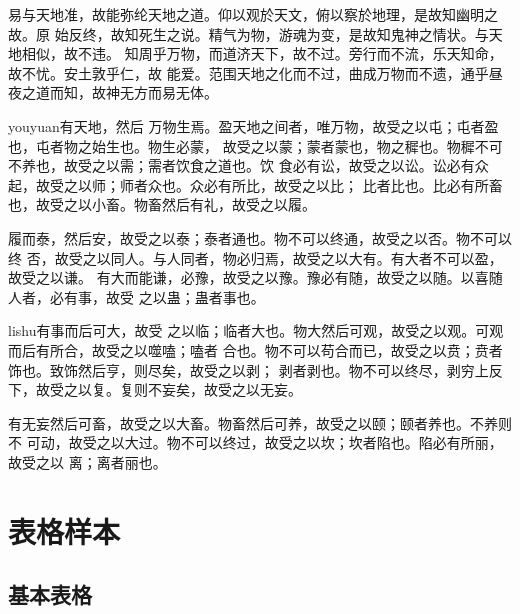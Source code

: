 {\fangsong 易与天地准，故能弥纶天地之道。仰以观於天文，俯以察於地理，是故知幽明之故。原
  始反终，故知死生之说。精气为物，游魂为变，是故知鬼神之情状。与天地相似，故不违。
  知周乎万物，而道济天下，故不过。旁行而不流，乐天知命，故不忧。安土敦乎仁，故
  能爱。范围天地之化而不过，曲成万物而不遗，通乎昼夜之道而知，故神无方而易无体。}

{\ifcsname youyuan\endcsname\youyuan\else[无 \cs{youyuan} 字体。]\fi 有天地，然后
  万物生焉。盈天地之间者，唯万物，故受之以屯；屯者盈也，屯者物之始生也。物生必蒙，
  故受之以蒙；蒙者蒙也，物之穉也。物穉不可不养也，故受之以需；需者饮食之道也。饮
  食必有讼，故受之以讼。讼必有众起，故受之以师；师者众也。众必有所比，故受之以比；
  比者比也。比必有所畜也，故受之以小畜。物畜然后有礼，故受之以履。}

{\heiti 履而泰，然后安，故受之以泰；泰者通也。物不可以终通，故受之以否。物不可以终
  否，故受之以同人。与人同者，物必归焉，故受之以大有。有大者不可以盈，故受之以谦。
  有大而能谦，必豫，故受之以豫。豫必有随，故受之以随。以喜随人者，必有事，故受
  之以蛊；蛊者事也。}

{\ifcsname lishu\endcsname\lishu\else[无 \cs{lishu} 字体。]\fi 有事而后可大，故受
  之以临；临者大也。物大然后可观，故受之以观。可观而后有所合，故受之以噬嗑；嗑者
  合也。物不可以苟合而已，故受之以贲；贲者饰也。致饰然后亨，则尽矣，故受之以剥；
  剥者剥也。物不可以终尽，剥穷上反下，故受之以复。复则不妄矣，故受之以无妄。}

{\songti 有无妄然后可畜，故受之以大畜。物畜然后可养，故受之以颐；颐者养也。不养则不
  可动，故受之以大过。物不可以终过，故受之以坎；坎者陷也。陷必有所丽，故受之以
  离；离者丽也。}

\section{表格样本}
\label{chap1:sample:table}

\subsection{基本表格}
\label{sec:basictable}

